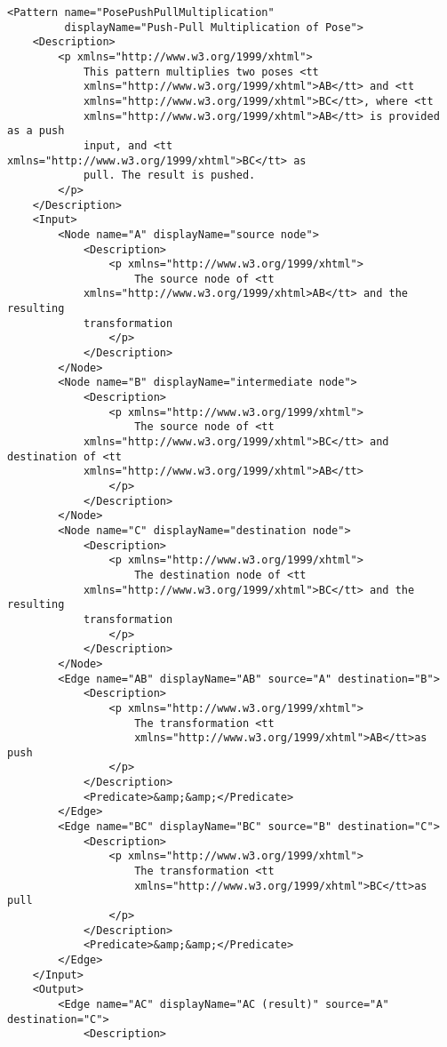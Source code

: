 \documentclass[11pt]{article}
\begin{document}
\begin{Verbatim}[fontsize=\footnotesize,tabsize=2]
<Pattern name="PosePushPullMultiplication"
         displayName="Push-Pull Multiplication of Pose">
    <Description>
        <p xmlns="http://www.w3.org/1999/xhtml">
            This pattern multiplies two poses <tt
            xmlns="http://www.w3.org/1999/xhtml">AB</tt> and <tt
            xmlns="http://www.w3.org/1999/xhtml">BC</tt>, where <tt
            xmlns="http://www.w3.org/1999/xhtml">AB</tt> is provided as a push
            input, and <tt xmlns="http://www.w3.org/1999/xhtml">BC</tt> as
            pull. The result is pushed.
        </p>
    </Description>
    <Input>
        <Node name="A" displayName="source node">
            <Description>
                <p xmlns="http://www.w3.org/1999/xhtml">
                    The source node of <tt
		    xmlns="http://www.w3.org/1999/xhtml>AB</tt> and the resulting
		    transformation
                </p>
            </Description>
        </Node>
        <Node name="B" displayName="intermediate node">
            <Description>
                <p xmlns="http://www.w3.org/1999/xhtml">
                    The source node of <tt
		    xmlns="http://www.w3.org/1999/xhtml">BC</tt> and destination of <tt
		    xmlns="http://www.w3.org/1999/xhtml">AB</tt>
                </p>
            </Description>
        </Node>
        <Node name="C" displayName="destination node">
            <Description>
                <p xmlns="http://www.w3.org/1999/xhtml">
                    The destination node of <tt
		    xmlns="http://www.w3.org/1999/xhtml">BC</tt> and the resulting
		    transformation
                </p>
            </Description>
        </Node>
        <Edge name="AB" displayName="AB" source="A" destination="B">
            <Description>
                <p xmlns="http://www.w3.org/1999/xhtml">
                    The transformation <tt
                    xmlns="http://www.w3.org/1999/xhtml">AB</tt>as push
                </p>
            </Description>
            <Predicate>&amp;&amp;</Predicate>
        </Edge>
        <Edge name="BC" displayName="BC" source="B" destination="C">
            <Description>
                <p xmlns="http://www.w3.org/1999/xhtml">
                    The transformation <tt
                    xmlns="http://www.w3.org/1999/xhtml">BC</tt>as pull
                </p>
            </Description>
            <Predicate>&amp;&amp;</Predicate>
        </Edge>
    </Input>
    <Output>
        <Edge name="AC" displayName="AC (result)" source="A" destination="C">
            <Description>

\end{Verbatim}
\end{document}
